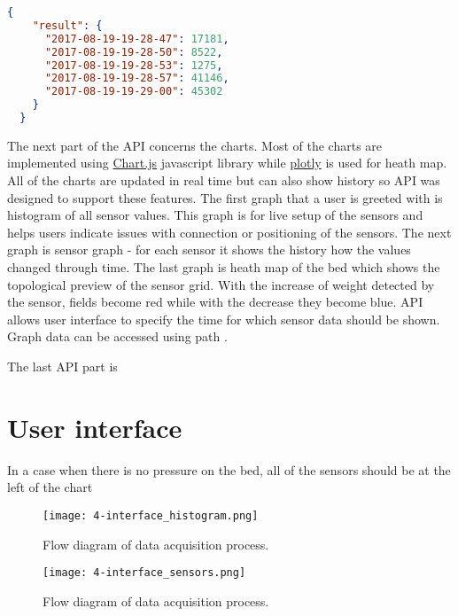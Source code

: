 \begin{lstlisting}[language=json,firstnumber=1,caption={API result for first 5 readings done in a set period of time},label={lst:api_filter}]
  {
    "result": {
      "2017-08-19-19-28-47": 17181, 
      "2017-08-19-19-28-50": 8522, 
      "2017-08-19-19-28-53": 1275, 
      "2017-08-19-19-28-57": 41146, 
      "2017-08-19-19-29-00": 45302
    }
  }
\end{lstlisting}

The next part of the \ac{API} concerns the charts. Most of the charts are implemented using \href{http://www.chartjs.org}{Chart.js} javascript library while \href{https://plot.ly}{plotly} is used for heath map. All of the charts are updated in real time but can also show history so \ac{API} was designed to support these features. The first graph that a user is greeted with is histogram of all sensor values. This graph is for live setup of the sensors and helps users indicate issues with connection or positioning of the sensors. The next graph is sensor graph - for each sensor it shows the history how the values changed through time. The last graph is heath map of the bed which shows the topological preview of the sensor grid. With the increase of weight detected by the sensor, fields become red while with the decrease they become blue. \ac{API} allows user interface to specify the time for which sensor data should be shown. Graph data can be accessed using path .

The last \ac{API} part is 

\section{User interface}

In a case when there is no pressure on the bed, all of the sensors should be at the left of the chart

\begin{figure}[h]
  \begin{center}
    \texttt{[image: 4-interface\_histogram.png]}
  \end{center}
  \caption{Flow diagram of data acquisition process.}
  \label{fig:interface_histogram}
\end{figure}

\begin{figure}[h]
  \begin{center}
    \texttt{[image: 4-interface\_sensors.png]}
  \end{center}
  \caption{Flow diagram of data acquisition process.}
  \label{fig:interface_sensors}
\end{figure}

